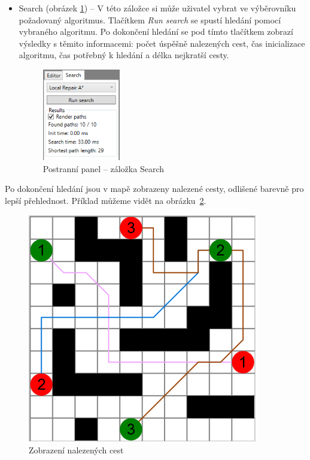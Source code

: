\begin{itemize}
	\item Search (obrázek \ref{obr:sideSearch}) -- V této záložce si může uživatel vybrat ve výběrovníku požadovaný algoritmus. Tlačítkem \emph{Run search} se spustí hledání pomocí vybraného algoritmu. Po dokončení hledání se pod tímto tlačítkem zobrazí výsledky s těmito informacemi: počet úspěšně nalezených cest, čas inicializace algoritmu, čas potřebný k hledání a délka nejkratší cesty.
	\begin{figure}[htb]
		\begin{center}
			\includegraphics*[height=4cm,keepaspectratio]{obr/sideSearch}
		\end{center}
		\caption{Postranní panel -- záložka Search}
		\label{obr:sideSearch}
	\end{figure}
\end{itemize}

Po dokončení hledání jsou v mapě zobrazeny nalezené cesty, odlišené barevně pro lepší přehlednost. Příklad můžeme vidět na obrázku~\ref{obr:foundPaths}.

\begin{figure}[htb]
	\begin{center}
		\includegraphics*[height=10cm,keepaspectratio]{obr/foundPaths}
	\end{center}
	\caption{Zobrazení nalezených cest}
	\label{obr:foundPaths}
\end{figure}

